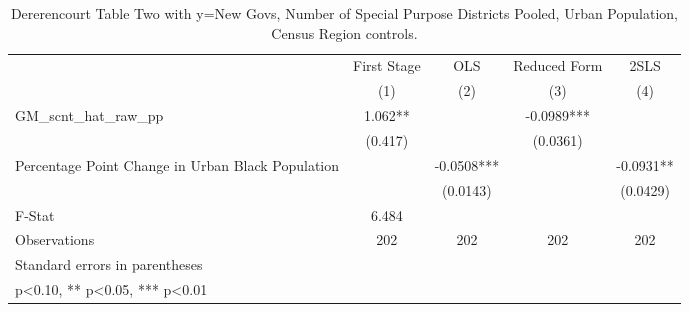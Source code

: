 \begin{table}[htbp]\centering
\def\sym#1{\ifmmode^{#1}\else\(^{#1}\)\fi}
\caption{Dererencourt Table Two with y=New Govs, Number of Special Purpose Districts Pooled, Urban Population, Census Region controls.}
\begin{tabular}{l*{4}{c}}
\toprule
                    & First Stage   &         OLS   &Reduced Form   &        2SLS   \\
                    &\multicolumn{1}{c}{(1)}   &\multicolumn{1}{c}{(2)}   &\multicolumn{1}{c}{(3)}   &\multicolumn{1}{c}{(4)}   \\
\midrule
GM\_scnt\_hat\_raw\_pp  &       1.062** &               &     -0.0989***&               \\
                    &     (0.417)   &               &    (0.0361)   &               \\
\addlinespace
Percentage Point Change in Urban Black Population&               &     -0.0508***&               &     -0.0931** \\
                    &               &    (0.0143)   &               &    (0.0429)   \\
\midrule
F-Stat              &       6.484   &               &               &               \\
Observations        &         202   &         202   &         202   &         202   \\
\bottomrule
\multicolumn{5}{l}{\footnotesize Standard errors in parentheses}\\
\multicolumn{5}{l}{\footnotesize * p<0.10, ** p<0.05, *** p<0.01}\\
\end{tabular}
\end{table}
